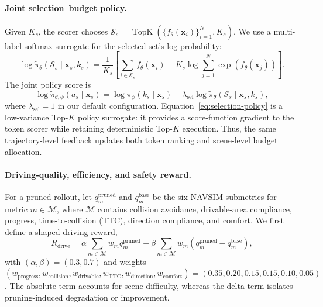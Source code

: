 \documentclass[letterpaper]{article} %
\begin{document}
\paragraph{Joint selection--budget policy.}
Given $K_s$, the scorer chooses $\mathcal{S}_s=\operatorname{TopK}(\{f_\theta(\mathbf{x}_i)\}_{i=1}^{N},K_s)$. We use a multi-label softmax surrogate for the selected set's log-probability:
\begin{equation}
\log\widetilde{\pi}_\theta(\mathcal{S}_s\mid\mathbf{x}_s,k_s)
=
\frac{1}{K_s}\left[
\sum_{i\in\mathcal{S}_s} f_\theta(\mathbf{x}_i)
-K_s\log\sum_{j=1}^{N}\exp\left(f_\theta(\mathbf{x}_j)\right)
\right].
\label{eq:selection-policy}
\end{equation}
The joint policy score is
\begin{equation}
\log\widetilde{\pi}_{\theta,\phi}(a_s\mid\mathbf{x}_s)
=
\log\pi_\phi(k_s\mid\bar{\mathbf{x}}_s)
+\lambda_{\mathrm{sel}}\log\widetilde{\pi}_\theta(\mathcal{S}_s\mid\mathbf{x}_s,k_s),
\label{eq:joint-policy}
\end{equation}
where $\lambda_{\mathrm{sel}}{=}1$ in our default configuration. Equation~\ref{eq:selection-policy} is a low-variance Top-$K$ policy surrogate: it provides a score-function gradient to the token scorer while retaining deterministic Top-$K$ execution. Thus, the same trajectory-level feedback updates both token ranking and scene-level budget allocation.

\paragraph{Driving-quality, efficiency, and safety reward.}
For a pruned rollout, let $q_m^{\mathrm{pruned}}$ and $q_m^{\mathrm{base}}$ be the six NAVSIM submetrics for metric $m\in\mathcal{M}$, where $\mathcal{M}$ contains collision avoidance, drivable-area compliance, progress, time-to-collision (TTC), direction compliance, and comfort. We first define a shaped driving reward,
\begin{equation}
R_{\mathrm{drive}}=
\alpha\sum_{m\in\mathcal{M}}w_mq_m^{\mathrm{pruned}}
+\beta\sum_{m\in\mathcal{M}}w_m\left(q_m^{\mathrm{pruned}}-q_m^{\mathrm{base}}\right),
\label{eq:driving-reward}
\end{equation}
with $(\alpha,\beta)=(0.3,0.7)$ and weights $(w_{\mathrm{progress}},w_{\mathrm{collision}},w_{\mathrm{drivable}},w_{\mathrm{TTC}},w_{\mathrm{direction}},w_{\mathrm{comfort}})=(0.35,0.20,0.15,0.15,0.10,0.05)$. The absolute term accounts for scene difficulty, whereas the delta term isolates pruning-induced degradation or improvement.
\end{document}

